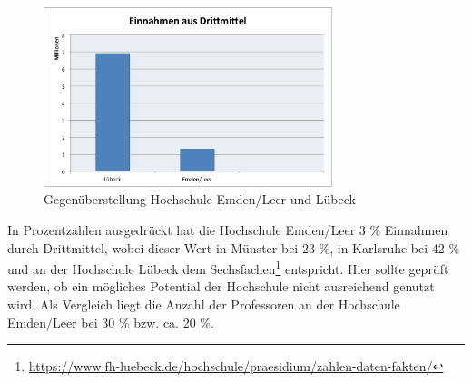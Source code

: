 \begin{figure}[h!]
	\centering
	\includegraphics[width=0.75\textwidth]
	{kapitel/gruppe4_2/bilder/EinnhamenDrittmittel}
	\caption{Gegenüberstellung Hochschule Emden/Leer und Lübeck}
	\label{fig_ubersicht_karlsruhe}
\end{figure}

In Prozentzahlen ausgedrückt hat die Hochschule Emden/Leer 3 \% Einnahmen durch Drittmittel, wobei dieser Wert in Münster bei 23 \%, in Karlsruhe bei 42 \% und an der Hochschule Lübeck dem Sechsfachen\footnote{\url{https://www.fh-luebeck.de/hochschule/praesidium/zahlen-daten-fakten/}} entspricht. Hier sollte geprüft werden, ob ein mögliches Potential der Hochschule nicht ausreichend genutzt wird. Als Vergleich liegt die Anzahl der Professoren an der Hochschule Emden/Leer bei 30 \% bzw. ca. 20 \%.

